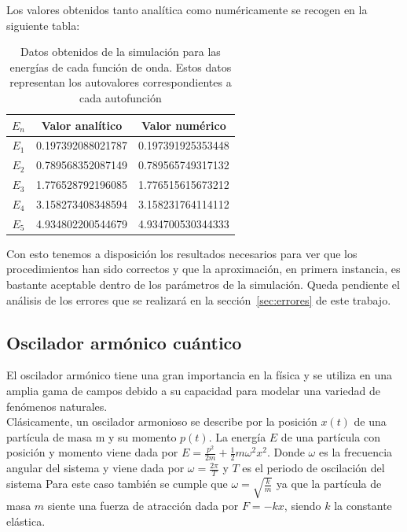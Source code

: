 \documentclass[12pt]{article}
\begin{document}
Los valores obtenidos tanto analítica como numéricamente se recogen en la siguiente tabla:


\begin{table}[H]
    \centering
    \begin{tabular}{|c||c||c|}
    \hline
        $E_n$ & Valor analítico & Valor numérico \\ \hline \hline
        $E_1$ & 0.197392088021787 & 0.197391925353448 \\ \hline
        $E_2$ & 0.789568352087149 & 0.789565749317132 \\ \hline
        $E_3$ & 1.776528792196085 & 1.776515615673212 \\ \hline
        $E_4$ & 3.158273408348594 & 3.158231764114112 \\ \hline
        $E_5$ & 4.934802200544679 & 4.934700530344333 \\ \hline
    \end{tabular}
    \caption{Datos obtenidos de la simulación para las energías de cada función de onda. Estos datos representan los autovalores correspondientes a cada autofunción}
\end{table}

Con esto tenemos a disposición los resultados necesarios para ver que los procedimientos han sido correctos y que la aproximación, en primera instancia, es bastante aceptable dentro de los parámetros de la simulación. Queda pendiente el análisis de los errores que se realizará en la sección~\ref{sec:errores} de este trabajo.

    \subsection{Oscilador armónico cuántico}

    El oscilador armónico tiene una gran importancia en la física 
    y se utiliza en una amplia gama de campos debido a su capacidad para modelar una variedad de fenómenos naturales.\\
    
    Clásicamente, un oscilador armonioso se describe por la posición $x(t)$ de una partícula de masa m y su momento $p(t)$. 
    La energía $E$ de una partícula con posición y momento viene dada por $E = \frac{p^2}{2m} + \frac{1}{2}m\omega^2x^2$.
    Donde $\omega$ es la frecuencia angular del sistema y viene dada por $\omega=\frac{2\pi}{T}$ y $T$ es el periodo de oscilación del sistema
    Para este caso también se cumple que $\omega=\sqrt{\frac{k}{m}}$ ya que la partícula de masa $m$ siente una fuerza de atracción dada por $F=-kx$, siendo $k$ la constante elástica.\\
    
\end{document}
